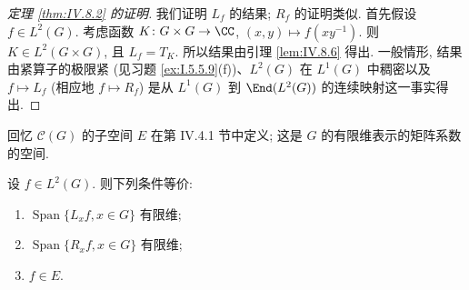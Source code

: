 \begin{proof}[定理 \ref{thm:IV.8.2} 的证明]
我们证明 $L_f$ 的结果; $R_f$ 的证明类似.
首先假设 $f \in L^2(G)$. 考虑函数 $K \colon G \times G \to \CC$, $(x, y) \longmapsto f(xy^{-1})$. 则 $K \in L^2(G \times G)$, 且 $L_f = T_K$. 所以结果由引理 \ref{lem:IV.8.6} 得出.
一般情形, 结果由紧算子的极限紧 (见习题 \ref{ex:I.5.5.9}(f))、$L^2(G)$ 在 $L^1(G)$ 中稠密以及 $f \longmapsto L_f$ (相应地 $f \longmapsto R_f$) 是从 $L^1(G)$ 到 $\End(L^2(G))$ 的连续映射这一事实得出.
\end{proof}

回忆 $\mathcal{C}(G)$ 的子空间 $E$ 在第 IV.4.1 节中定义; 这是 $G$ 的有限维表示的矩阵系数的空间.

\begin{proposition}[有限维子表示]
\label{prop:IV.8.7}
设 $f \in L^2(G)$. 则下列条件等价:
\begin{enumerate}
\item[(i)] $\operatorname{Span}\{L_xf, x \in G\}$ 有限维;
\item[(ii)] $\operatorname{Span}\{R_xf, x \in G\}$ 有限维;
\item[(iii)] $f \in E$.
\end{enumerate}
\end{proposition}

